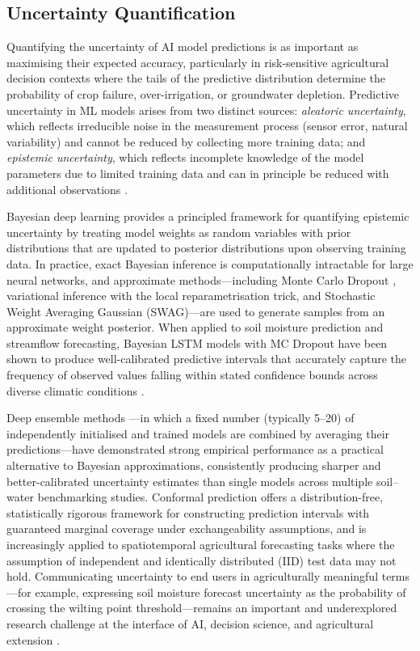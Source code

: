 \documentclass[land,article,submit,pdftex,moreauthors]{Definitions/mdpi}
\numberwithin{equation}{section}
\begin{document}
\subsection{Uncertainty Quantification}

Quantifying the uncertainty of AI model predictions is as important as maximising their expected accuracy, particularly in risk-sensitive agricultural decision contexts where the tails of the predictive distribution determine the probability of crop failure, over-irrigation, or groundwater depletion. Predictive uncertainty in ML models arises from two distinct sources: \emph{aleatoric uncertainty}, which reflects irreducible noise in the measurement process (sensor error, natural variability) and cannot be reduced by collecting more training data; and \emph{epistemic uncertainty}, which reflects incomplete knowledge of the model parameters due to limited training data and can in principle be reduced with additional observations \citep{hullermeier2021aleatoric}.

Bayesian deep learning provides a principled framework for quantifying epistemic uncertainty by treating model weights as random variables with prior distributions that are updated to posterior distributions upon observing training data. In practice, exact Bayesian inference is computationally intractable for large neural networks, and approximate methods---including Monte Carlo Dropout \citep{gal2016dropout}, variational inference with the local reparametrisation trick, and Stochastic Weight Averaging Gaussian (SWAG)---are used to generate samples from an approximate weight posterior. When applied to soil moisture prediction and streamflow forecasting, Bayesian LSTM models with MC Dropout have been shown to produce well-calibrated predictive intervals that accurately capture the frequency of observed values falling within stated confidence bounds across diverse climatic conditions \citep{zhu2022lstm}.

Deep ensemble methods \citep{lakshminarayanan2017simple}---in which a fixed number (typically 5--20) of independently initialised and trained models are combined by averaging their predictions---have demonstrated strong empirical performance as a practical alternative to Bayesian approximations, consistently producing sharper and better-calibrated uncertainty estimates than single models across multiple soil--water benchmarking studies. Conformal prediction \citep{angelopoulos2023conformal} offers a distribution-free, statistically rigorous framework for constructing prediction intervals with guaranteed marginal coverage under exchangeability assumptions, and is increasingly applied to spatiotemporal agricultural forecasting tasks where the assumption of independent and identically distributed (IID) test data may not hold. Communicating uncertainty to end users in agriculturally meaningful terms---for example, expressing soil moisture forecast uncertainty as the probability of crossing the wilting point threshold---remains an important and underexplored research challenge at the interface of AI, decision science, and agricultural extension \citep{moges2021review}.
\end{document}
